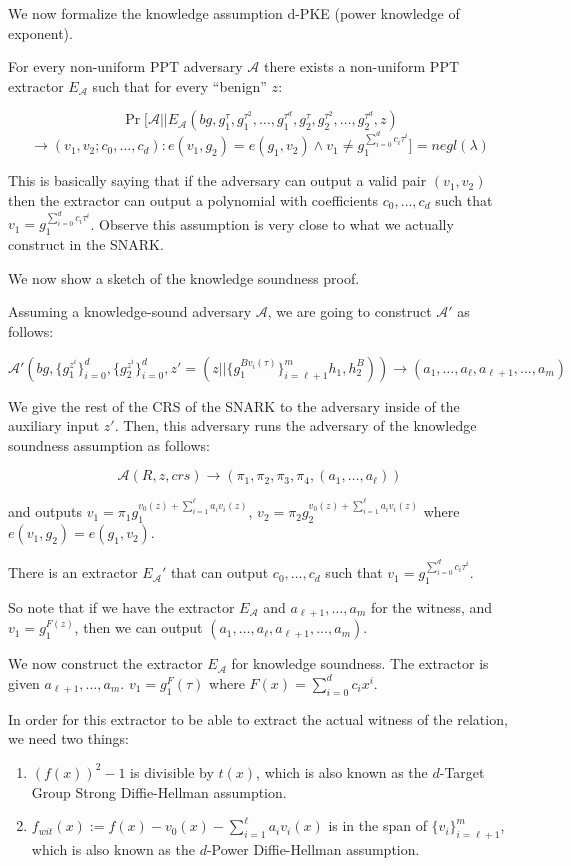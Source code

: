 We now formalize the knowledge assumption d-PKE (power knowledge of exponent).

For every non-uniform PPT adversary $\mathcal{A}$ there exists a non-uniform PPT extractor $E_\mathcal{A}$ such that for every ``benign'' $z$:

$$\Pr [\mathcal{A} || E_\mathcal{A} (bg, g_1^\tau, g_1^{\tau^2}, \dots, g_1^{\tau^d}, g_2^\tau, g_2^{\tau^2}, \dots, g_2^{\tau^d}, z)$$
$$\rightarrow (v_1, v_2; c_0, \dots, c_d) : e(v_1, g_2) = e(g_1, v_2) \land v_1 \neq g_1^{\sum_{i=0}^d c_i \tau^i}] = negl(\lambda)$$

This is basically saying that if the adversary can output a valid pair $(v_1, v_2)$ then the extractor can output a polynomial with coefficients $c_0, \dots, c_d$ such that $v_1 = g_1^{\sum_{i=0}^d c_i \tau^i}$. Observe this assumption is very close to what we actually construct in the SNARK.

We now show a sketch of the knowledge soundness proof.

Assuming a knowledge-sound adversary $\mathcal{A}$, we are going to construct $\mathcal{A}'$ as follows:

$$\mathcal{A}'(bg, \{g_1^{z^i}\}_{i=0}^d, \{g_2^{z^i}\}_{i=0}^d, z' = (z || \{g_1^{B v_i(\tau)}\}_{i=\ell+1}^m h_1, h_2^B)) \rightarrow (a_1, \dots, a_\ell, a_{\ell+1}, \dots, a_m)$$

We give the rest of the CRS of the SNARK to the adversary inside of the auxiliary input $z'$. Then, this adversary runs the adversary of the knowledge soundness assumption as follows:

$$\mathcal{A}(R, z, crs) \rightarrow (\pi_1, \pi_2, \pi_3, \pi_4, (a_1, \dots, a_\ell))$$

and outputs $v_1 = \pi_1 g_1^{v_0(z) + \sum_{i=1}^\ell a_i v_i(z)}$, $v_2 = \pi_2 g_2^{v_0(z) + \sum_{i=1}^\ell a_i v_i(z)}$ where $e(v_1, g_2) = e(g_1, v_2)$.

There is an extractor $E_\mathcal{A}'$ that can output $c_0, \dots, c_d$ such that $v_1 = g_1^{\sum_{i=0}^d c_i \tau^i}$.

So note that if we have the extractor $E_\mathcal{A}$ and $a_{\ell+1}, \dots, a_m$ for the witness, and $v_1 = g_1^{F(z)}$, then we can output $(a_1, \dots, a_\ell, a_{\ell+1}, \dots, a_m)$.

We now construct the extractor $E_\mathcal{A}$ for knowledge soundness. The extractor is given $a_{\ell+1}, \dots, a_m$. $v_1 = g_1^F(\tau)$ where $F(x) = \sum_{i=0}^d c_i x^i$.

In order for this extractor to be able to extract the actual witness of the relation, we need two things:
\begin{enumerate}
    \item $(f(x))^2 - 1$ is divisible by $t(x)$, which is also known as the $d$-Target Group Strong Diffie-Hellman assumption.
    \item $f_{wit}(x) := f(x) - v_0(x) - \sum_{i=1}^\ell a_i v_i(x)$ is in the span of $\{v_i\}_{i=\ell+1}^m$, which is also known as the $d$-Power Diffie-Hellman assumption.
\end{enumerate}

